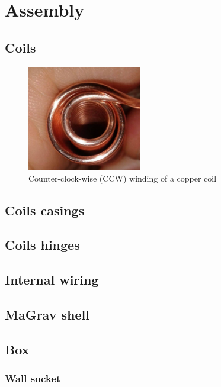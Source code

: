 \section{Assembly}
\label{sec:assembly}

\subsection{Coils}
\label{sec:coils}

\begin{figure}[h]
  \centering
  \includegraphics[width=50mm]{images/counter_clock_wise_winding.jpg}
  \caption[Counter-clock-wise (CCW) winding of a copper coil]{Counter-clock-wise (CCW) winding of a copper coil}
  \label{fig:ccw}
\end{figure}

\subsection{Coils casings}
\label{sec:coils-casings}

\subsection{Coils hinges}
\label{sec:coils-hinges}

\subsection{Internal wiring}
\label{sec:internal-wiring}

\subsection{MaGrav shell}
\label{sec:magrav-shell}

\subsection{Box}
\label{sec:box}

\subsubsection{Wall socket}
\label{sec:wall-socket}